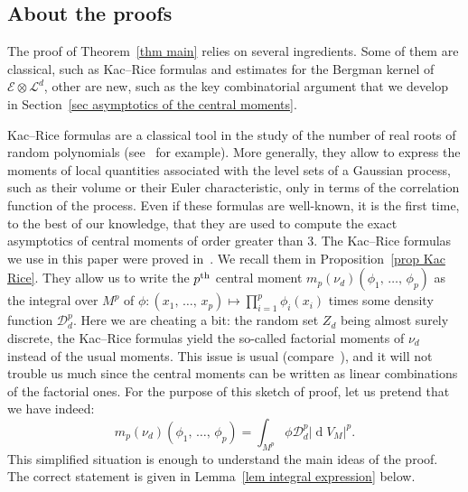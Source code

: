 \documentclass[AHL,Unicode,longabstracts,published]{cedram}
\DeclareMathOperator{\dmesure}{d}
\newcommand{\D}{\mathcal{D}}
\newcommand{\E}{\mathcal{E}}
\renewcommand{\L}{\mathcal{L}}
\newcommand{\norm}[1]{\left\lvert #1 \right\rvert}
\newcommand{\rmes}[1]{\norm{\dmesure\! V_{#1}}}
\begin{document}
\subsection*{About the proofs}

The proof of Theorem~\ref{thm main} relies on several ingredients. Some of them are classical, such as Kac--Rice formulas and estimates for the Bergman kernel of $\E \otimes \L^d$, other are new, such as the key combinatorial argument that we develop in Section~\ref{sec asymptotics of the central moments}.

Kac--Rice formulas are a classical tool in the study of the number of real roots of random polynomials (see~\cite{AT2007,AW2009} for example). More generally, they allow to express the moments of local quantities associated with the level sets of a Gaussian process, such as their volume or their Euler characteristic, only in terms of the correlation function of the process. Even if these formulas are well-known, it is the first time, to the best of our knowledge, that they are used to compute the exact asymptotics of central moments of order greater than $3$. The Kac--Rice formulas we use in this paper were proved in~\cite{Anc2019}. We recall them in Proposition~\ref{prop Kac Rice}. They allow us to write the $p^{\rm th}$ central moment $m_p(\nu_d)(\phi_1,\,\dots,\,\phi_p)$ as the integral over $M^p$ of $\phi:(x_1,\,\dots,\,x_p) \mapsto \prod_{i=1}^p \phi_i(x_i)$ times some density function $\D_d^p$. Here we are cheating a bit: the random set $Z_d$ being almost surely discrete, the Kac--Rice formulas yield the so-called factorial moments of $\nu_d$ instead of the usual moments. This issue is usual (compare~\cite{AT2007,AW2009}), and it will not trouble us much since the central moments can be written as linear combinations of the factorial ones. For the purpose of this sketch of proof, let us pretend that we have indeed:
\[
m_p(\nu_d)\left(\phi_1,\,\dots,\,\phi_p\right) = \int_{M^p} \phi \D_d^p \rmes{M}^p.
\]
This simplified situation is enough to understand the main ideas of the proof. The correct statement is given in Lemma~\ref{lem integral expression} below.
\end{document}
